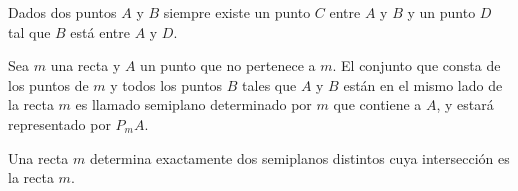 \begin{axioma}
    Dados dos puntos $A$ y $B$ siempre existe un punto $C$ entre $A$ y $B$ y un punto $D$ tal que $B$ está entre $A$ y $D$.\\
\end{axioma}

    \begin{def.}
	Sea $m$ una recta y $A$ un punto que no pertenece a $m$. El conjunto que consta de los puntos de $m$ y todos los puntos $B$ tales que $A$ y $B$ están en el mismo lado de la recta $m$ es llamado  semiplano  determinado por $m$ que contiene  a $A$, y estará representado por $P_mA$.\\
    \end{def.}

\begin{axioma}
   Una recta $m$ determina exactamente dos semiplanos distintos cuya intersección es la recta $m$.\\ 
\end{axioma}
